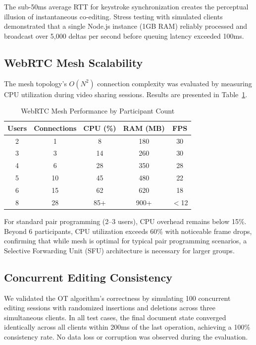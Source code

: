 \documentclass[conference]{IEEEtran}
\begin{document}
The sub-50ms average RTT for keystroke synchronization creates the perceptual illusion of instantaneous co-editing. Stress testing with simulated clients demonstrated that a single Node.js instance (1GB RAM) reliably processed and broadcast over 5,000 deltas per second before queuing latency exceeded 100ms.

\subsection{WebRTC Mesh Scalability}
The mesh topology's $O(N^2)$ connection complexity was evaluated by measuring CPU utilization during video sharing sessions. Results are presented in Table~\ref{tab:webrtc}.

\begin{table}[H]
\centering
\caption{WebRTC Mesh Performance by Participant Count}
\label{tab:webrtc}
\renewcommand{\arraystretch}{1.2}
\begin{tabular}{|c|c|c|c|c|}
\hline
\textbf{Users} & \textbf{Connections} & \textbf{CPU (\%)} & \textbf{RAM (MB)} & \textbf{FPS} \\
\hline
2 & 1 & 8 & 180 & 30 \\
\hline
3 & 3 & 14 & 260 & 30 \\
\hline
4 & 6 & 28 & 350 & 28 \\
\hline
5 & 10 & 45 & 480 & 22 \\
\hline
6 & 15 & 62 & 620 & 18 \\
\hline
8 & 28 & 85+ & 900+ & $<$12 \\
\hline
\end{tabular}
\end{table}

For standard pair programming (2--3 users), CPU overhead remains below 15\%. Beyond 6 participants, CPU utilization exceeds 60\% with noticeable frame drops, confirming that while mesh is optimal for typical pair programming scenarios, a Selective Forwarding Unit (SFU) architecture is necessary for larger groups.

\subsection{Concurrent Editing Consistency}
We validated the OT algorithm's correctness by simulating 100 concurrent editing sessions with randomized insertions and deletions across three simultaneous clients. In all test cases, the final document state converged identically across all clients within 200ms of the last operation, achieving a 100\% consistency rate. No data loss or corruption was observed during the evaluation.
\end{document}
